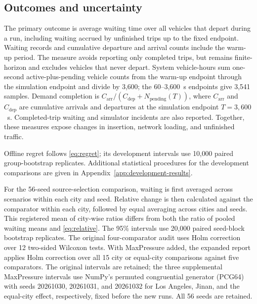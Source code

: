 \subsection{Outcomes and uncertainty}
The primary outcome is average waiting time over all vehicles that depart during a run, including waiting accrued by unfinished trips up to the fixed endpoint. Waiting records and cumulative departure and arrival counts include the warm-up period. The measure avoids reporting only completed trips, but remains finite-horizon and excludes vehicles that never depart. System vehicle-hours sum one-second active-plus-pending vehicle counts from the warm-up endpoint through the simulation endpoint and divide by 3,600; the 60--3,600~s endpoints give 3,541 samples. Demand completion is $C_{\mathrm{arr}}/(C_{\mathrm{dep}}+N_{\mathrm{pending}}(T))$, where $C_{\mathrm{arr}}$ and $C_{\mathrm{dep}}$ are cumulative arrivals and departures at the simulation endpoint $T=3{,}600$~s. Completed-trip waiting and simulator incidents are also reported. Together, these measures expose changes in insertion, network loading, and unfinished traffic.

Offline regret follows \eqref{eq:regret}; its development intervals use 10,000 paired group-bootstrap replicates. Additional statistical procedures for the development comparisons are given in Appendix~\ref{app:development-results}.

For the 56-seed source-selection comparison, waiting is first averaged across scenarios within each city and seed. Relative change is then calculated against the comparator within each city, followed by equal averaging across cities and seeds. This registered mean of city-wise ratios differs from both the ratio of pooled waiting means and \eqref{eq:relative}. The 95\% intervals use 20,000 paired seed-block bootstrap replicates. The original four-comparator audit uses Holm correction over 12 two-sided Wilcoxon tests. With MaxPressure added, the expanded report applies Holm correction over all 15 city or equal-city comparisons against five comparators. The original intervals are retained; the three supplemental MaxPressure intervals use NumPy's permuted congruential generator (PCG64) with seeds 20261030, 20261031, and 20261032 for Los Angeles, Jinan, and the equal-city effect, respectively, fixed before the new runs. All 56 seeds are retained.

